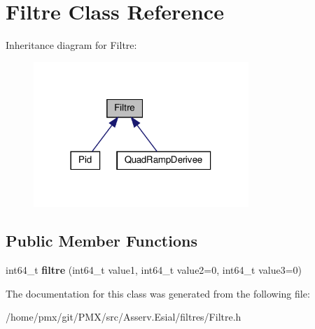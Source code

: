 \hypertarget{classFiltre}{}\section{Filtre Class Reference}
\label{classFiltre}


Inheritance diagram for Filtre\+:
\nopagebreak
\begin{figure}[H]
\begin{center}
\leavevmode
\includegraphics[width=230pt]{classFiltre__inherit__graph}
\end{center}
\end{figure}
\subsection*{Public Member Functions}
\begin{DoxyCompactItemize}
\item 
\mbox{\label{classFiltre_a2906754de0b3a590186034a9d64431e1}} 
int64\+\_\+t {\bfseries filtre} (int64\+\_\+t value1, int64\+\_\+t value2=0, int64\+\_\+t value3=0)
\end{DoxyCompactItemize}


The documentation for this class was generated from the following file\+:\begin{DoxyCompactItemize}
\item 
/home/pmx/git/\+P\+M\+X/src/\+Asserv.\+Esial/filtres/Filtre.\+h\end{DoxyCompactItemize}
